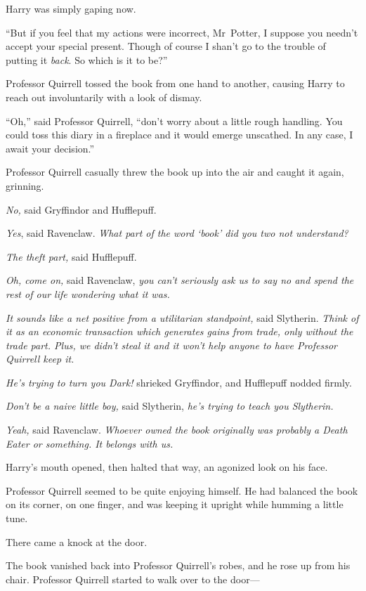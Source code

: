 Harry was simply gaping now.

“But if you feel that my actions were incorrect, Mr~Potter, I suppose you needn’t accept your special present. Though of course I shan’t go to the trouble of putting it \emph{back}. So which is it to be?”

Professor Quirrell tossed the book from one hand to another, causing Harry to reach out involuntarily with a look of dismay.

“Oh,” said Professor Quirrell, “don’t worry about a little rough handling. You could toss this diary in a fireplace and it would emerge unscathed. In any case, I await your decision.”

Professor Quirrell casually threw the book up into the air and caught it again, grinning.

\emph{No,} said Gryffindor and Hufflepuff.

\emph{Yes}, said Ravenclaw. \emph{What part of the word ‘book’ did you two not understand?}

\emph{The theft part,} said Hufflepuff.

\emph{Oh, come on,} said Ravenclaw, \emph{you can’t seriously ask us to say no and spend the rest of our life wondering what it was.}

\emph{It sounds like a net positive from a utilitarian standpoint,} said Slytherin. \emph{Think of it as an economic transaction which generates gains from trade, only without the trade part. Plus, \emph{we} didn’t steal it and it won’t help anyone to have Professor Quirrell keep it.}

\emph{He’s trying to turn you Dark!} shrieked Gryffindor, and Hufflepuff nodded firmly.

\emph{Don’t be a naive little boy,} said Slytherin, \emph{he’s trying to teach you Slytherin.}

\emph{Yeah,} said Ravenclaw. \emph{Whoever owned the book originally was probably a Death Eater or something. It belongs with us.}

Harry’s mouth opened, then halted that way, an agonized look on his face.

Professor Quirrell seemed to be quite enjoying himself. He had balanced the book on its corner, on one finger, and was keeping it upright while humming a little tune.

There came a knock at the door.

The book vanished back into Professor Quirrell’s robes, and he rose up from his chair. Professor Quirrell started to walk over to the door—

